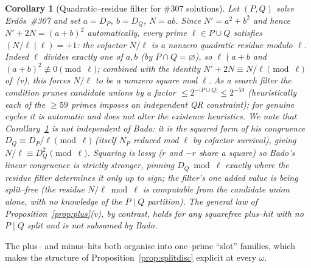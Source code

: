 \documentclass[11pt]{article}
\newtheorem{corollary}[theorem]{Corollary}
\theoremstyle{definition}
\begin{document}
\begin{corollary}[Quadratic--residue filter for \#307 solutions]\label{cor:qr}
Let $(P,Q)$ solve Erd\H{o}s~\#307 and set $a=D_P$, $b=D_Q$, $N=ab$. Since $N'=a^2+b^2$ and
hence $N'+2N=(a+b)^2$ automatically, every prime $\ell\in P\cup Q$ satisfies $(N/\ell\mid\ell)=+1$:
the cofactor $N/\ell$ is a nonzero quadratic residue modulo $\ell$. Indeed $\ell$ divides exactly
one of $a,b$ (by $P\cap Q=\varnothing$), so $\ell\nmid a+b$ and $(a+b)^2\not\equiv0\pmod\ell$;
combined with the identity $N'+2N\equiv N/\ell\pmod\ell$ of~\textup{(v)}, this forces $N/\ell$ to
be a nonzero square mod $\ell$. As a search filter the condition prunes candidate unions by a factor
${\le}2^{-|P\cup Q|}\le2^{-59}$ (heuristically each of the $\ge59$ primes imposes an independent
QR constraint); for genuine cycles it is automatic and does not alter the existence heuristics.
We note that Corollary~\ref{cor:qr} is \emph{not} independent of Bado: it is the squared form of his
congruence $D_Q\equiv D_P/\ell\pmod\ell$ (itself $N_P$ reduced mod $\ell$ by cofactor survival),
giving $N/\ell\equiv D_Q^2\pmod\ell$. Squaring is lossy ($r$ and $-r$ share a square) so Bado's
linear congruence is strictly stronger, pinning $D_Q\bmod\ell$ exactly where the residue filter
determines it only up to sign; the filter's one added value is being \emph{split--free} (the residue
$N/\ell\bmod\ell$ is computable from the candidate union alone, with no knowledge of the $P\mid Q$
partition). The general law of Proposition~\ref{prop:plus}(v), by contrast, holds for \emph{any}
squarefree plus--hit with no $P\mid Q$ split and is not subsumed by Bado.
\end{corollary}

The plus-- and minus--hits both organise into one--prime ``slot'' families, which makes the structure
of Proposition~\ref{prop:splitdisc} explicit at every $\omega$.
\end{document}
